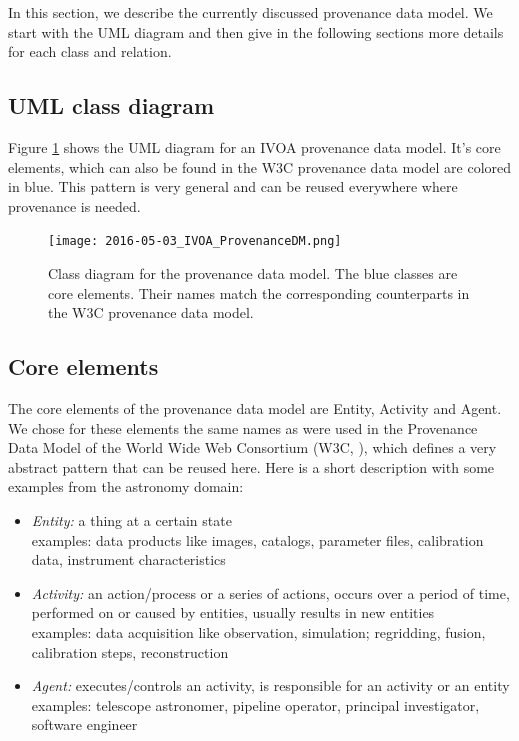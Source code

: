 In this section, we describe the currently discussed provenance data model. We 
start with the UML diagram and then give in the following sections more details 
for each class and relation.

\subsection{UML class diagram}
Figure \ref{fig:classdiagram} shows the UML diagram for an IVOA provenance data
model. It's core elements, which can also be found in the W3C provenance data
model are colored in blue. This pattern is very general and can be reused everywhere 
where provenance is needed. 


\begin{figure}
\centering
\texttt{[image: 2016-05-03\_IVOA\_ProvenanceDM.png]}
\caption{Class diagram for the provenance data model. The blue classes are core 
elements. Their names match the corresponding counterparts in the W3C provenance 
data model.}
\label{fig:classdiagram}
\end{figure}


\subsection{Core elements}\label{sec:core}

The core elements of the provenance data model are Entity, Activity and Agent. 
We chose for these elements the same names as were used in the Provenance Data 
Model of the World Wide Web Consortium (W3C, \cite{std:W3CProvDM}), which defines 
a very abstract pattern that can be reused here. Here is a short description with 
some examples from the astronomy domain:

\begin{itemize}
\item \emph{Entity:} a thing at a certain state\\
    examples: data products like images, catalogs, parameter files, calibration data, instrument characteristics

\item \emph{Activity:} an action/process or a series of actions, occurs over a period of time, performed on or caused by entities, usually results in new entities\\
    examples: data acquisition like observation, simulation; regridding, fusion, calibration steps, reconstruction

\item \emph{Agent:} executes/controls an activity, is responsible for an activity or an entity\\
    examples: telescope astronomer, pipeline operator, principal investigator, software engineer

\end{itemize}

